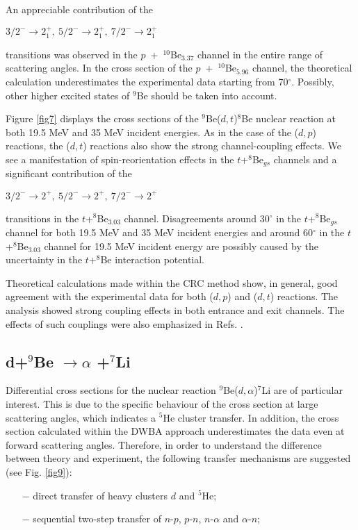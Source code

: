 \documentclass[
11pt, %
english, %
onehalfspacing, %
headsepline, %
]{MastersDoctoralThesis} %
\begin{document}
An appreciable contribution of the \begin{small}
$3/2^- \rightarrow 2^+_1,~5/2^- \rightarrow 2^+_1,~7/2^-\rightarrow 2^+_1$
\end{small} transitions was observed in the $p$~+~$^{10}$Be$_{3.37}$ channel in the entire range of scattering angles. 
In the cross section of the  $p$~+~$^{10}$Be$_{5.96}$ channel, the theoretical calculation underestimates the experimental data starting from 70$^\circ$. Possibly, other higher excited states of $^9$Be should be taken into account.

Figure \ref{fig7} displays the cross sections of the ${}^9$Be($d,t$)${}^{8}$Be nuclear reaction at both 19.5 MeV and 35 MeV incident energies. As in the case of the ($d,p$) reactions, the ($d,t$) reactions also show the strong channel-coupling effects. We see a manifestation of spin-reorientation effects in the $t$+$^8$Be$_{gs}$ channels and a significant contribution of the  \begin{small}
$3/2^- \rightarrow 2^+,~ 5/2^- \rightarrow 2^+,~ 7/2^-\rightarrow 2^+$
\end{small} transitions in the $t$+$^8$Be$_{3.03}$ channel.
Disagreements around 30$^\circ$ in the $t$+$^8$Be$_{gs}$ channel for both 19.5 MeV and 35 MeV incident energies and around 60$^\circ$ in the $t$+$^8$Be$_{3.03}$ channel for 19.5 MeV incident energy are possibly caused by the uncertainty in the $t$+$^8$Be interaction potential.

Theoretical calculations made within the CRC method show, in general, good agreement with the experimental data for both ($d,p$)  and ($d,t$) reactions.
The analysis showed strong coupling effects in both entrance and exit channels. The effects of such couplings were also emphasized in Refs. \cite{harakeh1980, rudchik2016}.


\subsection{d+$^9$Be $\rightarrow \alpha$ +$^{7}$Li}

Differential cross sections for the nuclear reaction ${^9}$Be($d,\alpha$)${}^7$Li are of particular interest. This is due to the specific behaviour of the cross section at large scattering angles, which indicates a ${}^5$He cluster transfer. In addition, the cross section calculated within the DWBA approach underestimates the data even at forward scattering angles. Therefore, in order to understand the difference between theory and experiment, the following transfer mechanisms are suggested (see Fig. \ref{fig9}):
\begin{itemize}
\item[$-$] direct transfer of heavy clusters $d$ and ${}^5$He;
\item[$-$] sequential two-step transfer of $n$-$p$, $p$-$n$, $n$-$\alpha$ and $\alpha$-$n$;
\end{itemize}
\end{document}
